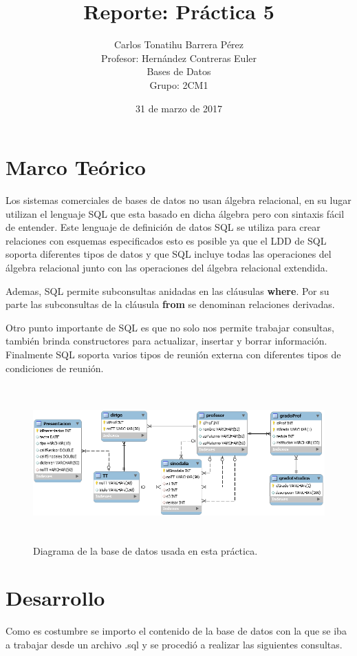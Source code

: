 \documentclass[12pt, titlepage]{article}
\title{Reporte: Práctica 5}
\author{Carlos Tonatihu Barrera Pérez \\ Profesor: Hernández Contreras Euler \\ Bases de Datos \\ Grupo: 2CM1 }
\date{31 de marzo de 2017}
\begin{document}
	\maketitle
	\tableofcontents
	\section{Marco Teórico}
	Los sistemas comerciales de bases de datos no usan álgebra relacional, en su lugar utilizan el lenguaje SQL que esta basado en dicha álgebra pero con sintaxis fácil de entender.
	Este lenguaje de definición de datos SQL se utiliza para crear relaciones con esquemas especificados esto es posible ya que el LDD de SQL soporta diferentes tipos de datos y que SQL incluye todas las operaciones del álgebra relacional junto con las operaciones del álgebra relacional extendida.\cite{LIBRO}
	
	Ademas, SQL permite subconsultas anidadas en las cláusulas \textbf{where}. Por su parte las subconsultas de la cláusula \textbf{from} se denominan relaciones derivadas.
	
	Otro punto importante de SQL es que no solo nos permite trabajar consultas, también brinda constructores para actualizar, insertar y borrar información. Finalmente SQL soporta varios tipos de reunión externa con diferentes tipos de condiciones de reunión.\cite{LIBRO}
	
	
	 \begin{figure}[H]
		\begin{center}
			\includegraphics[width=16cm, height=6cm]{tt.png}
			\caption{Diagrama de la base de datos usada en esta práctica.}
			\label{fig:home}
		\end{center}
	\end{figure}
\newpage
	\section{Desarrollo}
	Como es costumbre se importo el contenido de la base de datos con la que se iba a trabajar desde un archivo .sql y se procedió a realizar las siguientes consultas.
	
\end{document}
